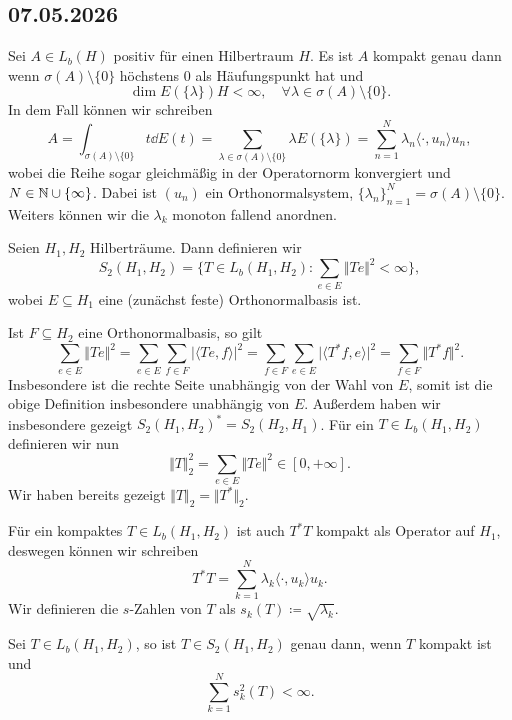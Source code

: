 \subsection*{07.05.2026}

\begin{remark}
    Sei $A \in L_b(H)$ positiv für einen Hilbertraum $H$. Es ist $A$ kompakt genau dann wenn $\sigma(A) \setminus \{ 0 \}$ höchstens $0$ als Häufungspunkt hat und
    $$ \dim E(\{ \lambda \}) H < \infty, \quad \forall \lambda \in \sigma(A) \setminus \{ 0 \}. $$
    In dem Fall können wir schreiben
    \[
        A = \int_{\sigma(A) \setminus \{0\}} t \dd E(t) = \sum_{\lambda \in \sigma(A) \setminus \{0\}} \lambda E(\{\lambda\}) = \sum_{n=1}^N \lambda_n \langle \cdot, u_n \rangle u_n,
    \]
    wobei die Reihe sogar gleichmäßig in der Operatornorm konvergiert und $N \in \mathbb{N} \cup \{\infty\}$. Dabei ist $(u_n)$ ein Orthonormalsystem, $\{ \lambda_n \}_{n = 1}^N = \sigma(A) \setminus \{0\}$. Weiters können wir die $\lambda_k$ monoton fallend anordnen.
\end{remark}

\begin{definition}
    Seien $H_1, H_2$ Hilberträume. Dann definieren wir
    \[
        S_2(H_1, H_2) = \{ T \in L_b(H_1, H_2) : \sum_{e \in E} \Vert T e \Vert^2 < \infty \},
    \]
    wobei $E \subseteq H_1$ eine (zunächst feste) Orthonormalbasis ist.
\end{definition}

Ist $F \subseteq H_2$ eine Orthonormalbasis, so gilt
\[
    \sum_{e \in E} \Vert T e \Vert^2
    =
    \sum_{e \in E} \sum_{f \in F} \vert \langle Te, f \rangle \vert^2
    =
    \sum_{f \in F} \sum_{e \in E} \vert \langle T^* f, e \rangle \vert^2
    =
    \sum_{f \in F} \Vert T^* f \Vert^2.
\]
Insbesondere ist die rechte Seite unabhängig von der Wahl von $E$, somit ist die obige Definition insbesondere unabhängig von $E$. Außerdem haben wir insbesondere gezeigt $S_2(H_1, H_2)^* = S_2(H_2, H_1)$. Für ein $T \in L_b(H_1, H_2)$ definieren wir nun
\[
    \Vert T \Vert_2^2 = \sum_{e \in E} \Vert Te \Vert^2 \in [0, +\infty].
\]
Wir haben bereits gezeigt $\Vert T \Vert_2 = \Vert T^* \Vert_2$.

Für ein kompaktes $T \in L_b(H_1, H_2)$ ist auch $T^* T$ kompakt als Operator auf $H_1$, deswegen können wir schreiben
\[
    T^*T = \sum_{k=1}^N \lambda_k \langle \cdot, u_k \rangle u_k.
\]
Wir definieren die $s$-Zahlen von $T$ als $s_k(T) \coloneqq \sqrt{\lambda_k}$.

\begin{lemma}
    Sei $T \in L_b(H_1, H_2)$, so ist $T \in S_2(H_1, H_2)$ genau dann, wenn $T$ kompakt ist und
    \[
        \sum_{k=1}^N s_k^2(T) < \infty.
    \]
\end{lemma}

